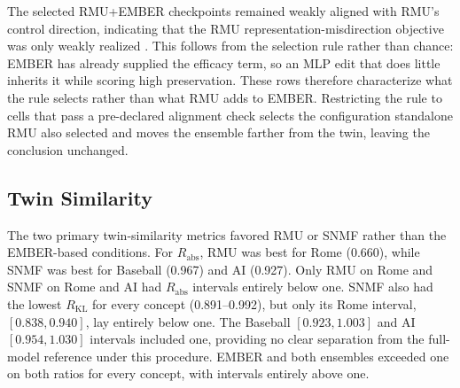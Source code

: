 The selected RMU+EMBER checkpoints remained weakly aligned with RMU's control
direction, indicating that the RMU representation-misdirection objective was
only weakly realized \citep{li2024wmdp}. This follows from the selection rule
rather than chance: EMBER has already supplied the efficacy term, so an MLP
edit that does little inherits it while scoring high preservation. These rows
therefore characterize what the rule selects rather than what RMU adds to
EMBER. Restricting the rule to cells that pass a pre-declared alignment check
selects the configuration standalone RMU also selected and moves the ensemble
farther from the twin, leaving the conclusion unchanged.

\subsection{Twin Similarity}

The two primary twin-similarity metrics favored RMU or SNMF rather than the
EMBER-based conditions. For $R_{\mathrm{abs}}$, RMU was best for Rome (0.660),
while SNMF was best for Baseball (0.967) and AI (0.927). Only RMU on Rome and
SNMF on Rome and AI had $R_{\mathrm{abs}}$ intervals entirely below one. SNMF
also had the lowest $R_{\mathrm{KL}}$ for every concept (0.891--0.992), but
only its Rome interval, $[0.838,0.940]$, lay entirely below one. The Baseball
$[0.923,1.003]$ and AI $[0.954,1.030]$ intervals included one, providing no
clear separation from the full-model reference under this procedure. EMBER
and both ensembles exceeded one on both ratios for every concept, with
intervals entirely above one.

